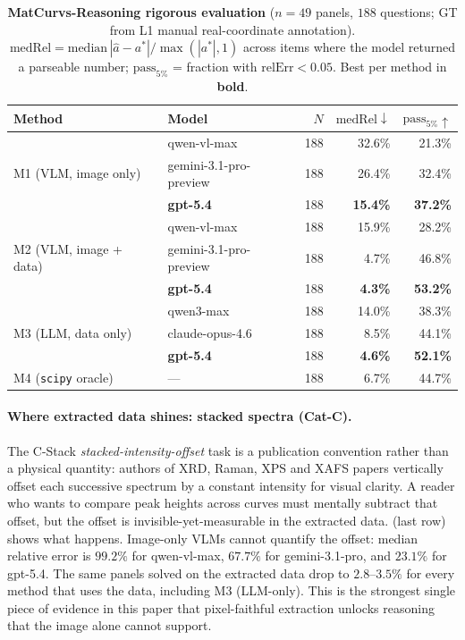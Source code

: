 \documentclass{article}
\begin{document}
\begin{table}[t]
\centering
\caption{\textbf{MatCurvs-Reasoning rigorous evaluation}
($n{=}49$ panels, $188$ questions; GT from L1 manual real-coordinate
annotation). $\mathrm{medRel}=\mathrm{median}\,|\hat{a}-a^{*}|/
\max(|a^{*}|,1)$ across items where the model returned a parseable
number; $\mathrm{pass}_{5\%}$ = fraction with $\mathrm{relErr}<0.05$.
Best per method in \textbf{bold}.}
\label{tab:mr-rigorous-headline}
\small
\begin{tabular}{llrrr}
\toprule
Method & Model & $N$ & $\mathrm{medRel}\downarrow$ & $\mathrm{pass}_{5\%}\uparrow$ \\
\midrule
\multirow{3}{*}{M1 (VLM, image only)}
  & qwen-vl-max            & 188 & 32.6\% & 21.3\% \\
  & gemini-3.1-pro-preview & 188 & 26.4\% & 32.4\% \\
  & \textbf{gpt-5.4}       & 188 & \textbf{15.4\%} & \textbf{37.2\%} \\
\midrule
\multirow{3}{*}{M2 (VLM, image + data)}
  & qwen-vl-max            & 188 & 15.9\% & 28.2\% \\
  & gemini-3.1-pro-preview & 188 &  4.7\% & 46.8\% \\
  & \textbf{gpt-5.4}       & 188 & \textbf{4.3\%}  & \textbf{53.2\%} \\
\midrule
\multirow{3}{*}{M3 (LLM, data only)}
  & qwen3-max              & 188 & 14.0\% & 38.3\% \\
  & claude-opus-4.6        & 188 &  8.5\% & 44.1\% \\
  & \textbf{gpt-5.4}       & 188 & \textbf{4.6\%}  & \textbf{52.1\%} \\
\midrule
M4 (\texttt{scipy} oracle) & --- & 188 & 6.7\% & 44.7\% \\
\bottomrule
\end{tabular}
\end{table}

\paragraph{Where extracted data shines: stacked spectra (Cat-C).}
The C-Stack \emph{stacked-intensity-offset} task is a publication
convention rather than a physical quantity: authors of XRD, Raman,
XPS and XAFS papers vertically offset each successive spectrum by a
constant intensity for visual clarity. A reader who wants to compare
peak heights across curves must mentally subtract that offset, but
the offset is invisible-yet-measurable in the extracted data.
 (last row) shows what happens.
Image-only VLMs cannot quantify the offset: median relative error is
$99.2\%$ for qwen-vl-max, $67.7\%$ for gemini-3.1-pro, and $23.1\%$
for gpt-5.4. The same panels solved on the extracted data drop to
$2.8$–$3.5\%$ for every method that uses the data, including M3
(LLM-only). This is the strongest single piece of evidence in this
paper that pixel-faithful extraction unlocks reasoning that the
image alone cannot support.
\end{document}
